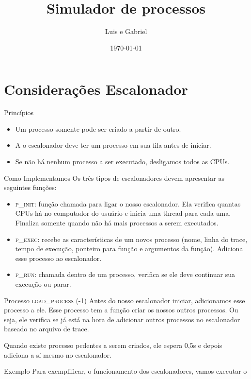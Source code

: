 \documentclass{beamer}
\title{Simulador de processos}
\date{\today}
\author{Luis e Gabriel}
\institute{Centre for Modern Beamer Themes}
\begin{document}
\maketitle

\section{Considerações Escalonador}
\begin{frame}{Princípios}
	\begin{itemize}
		\item Um processo somente pode ser criado a partir de outro.
		\item A o escalonador deve ter um processo em sua fila antes de iniciar.
		\item Se não há nenhum processo a ser executado, desligamos todos as CPUs.
	\end{itemize}
\end{frame}


\begin{frame}{Como Implementamos}
	Os três tipos de escalonadores devem apresentar as seguintes funções:
	\begin{itemize}
		\item \textsc{p\_init}: função chamada para ligar o nosso escalonador. Ela verifica quantas CPUs há no computador do usuário e inicia uma thread para cada uma. Finaliza somente quando não há mais processos a serem executados.
		\item \textsc{p\_exec}: recebe as características de um novos processo (nome, linha do trace, tempo de execução, ponteiro para função e argumentos da função). Adiciona esse processo ao escalonador.
		\item \textsc{p\_run}: chamada dentro de um processo, verifica se ele deve continuar sua execução ou parar.
	\end{itemize}
\end{frame}


\begin{frame}{Processo \textsc{load\_process} (-1)}
	\justifying
	Antes do nosso escalonador iniciar, adicionamos esse processo a ele. Esse processo tem a função criar os nossos outros processos. Ou seja, ele verifica se já está na hora de adicionar outros processos no escalonador baseado no arquivo de trace. 
	
	Quando existe processo pedentes a serem criados, ele espera 0,5s e depois adiciona a sí mesmo no escalonador. 
\end{frame}


\begin{frame}{Exemplo}
	\justifying
	Para exemplificar, o funcionamento dos escalonadores, vamos executar o 
	
	
\end{frame}
\end{document}
